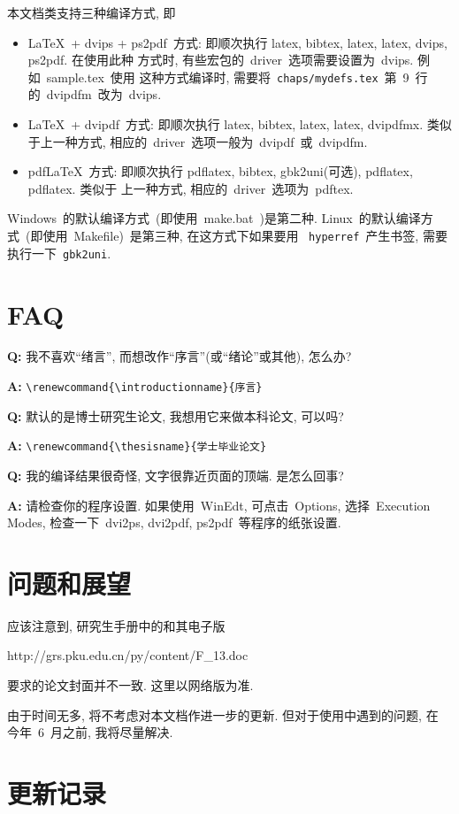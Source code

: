 本文档类支持三种编译方式, 即
\begin{itemize}
  \item \LaTeX\ + dvips + ps2pdf~方式:
    即顺次执行 latex, bibtex, latex, latex, dvips, ps2pdf. 在使用此种
    方式时, 有些宏包的~driver~选项需要设置为~dvips. 例如~sample.tex~使用
    这种方式编译时, 需要将~\verb|chaps/mydefs.tex|~第~9~行的~dvipdfm~改为~dvips.

  \item \LaTeX\ + dvipdf~方式:
    即顺次执行 latex, bibtex, latex, latex, dvipdfmx. 类似于上一种方式,
    相应的~driver~选项一般为~dvipdf~或~dvipdfm.

  \item pdf\LaTeX~方式:
    即顺次执行 pdflatex, bibtex, gbk2uni(可选), pdflatex, pdflatex. 类似于
    上一种方式, 相应的~driver~选项为~pdftex.
\end{itemize}
Windows~的默认编译方式~(即使用~make.bat~)是第二种.
Linux~的默认编译方式~(即使用~Makefile)~是第三种, 在这方式下如果要用
~\verb|hyperref|~产生书签, 需要执行一下~\verb|gbk2uni|.
\section{FAQ}

{\bf Q:} 我不喜欢``绪言'', 而想改作``序言''(或``绪论''或其他), 怎么办?

{\bf A:} \verb|\renewcommand{\introductionname}{序言}|

{\bf Q:} 默认的是博士研究生论文, 我想用它来做本科论文, 可以吗?

{\bf A:} \verb|\renewcommand{\thesisname}{学士毕业论文}|

{\bf Q:} 我的编译结果很奇怪, 文字很靠近页面的顶端. 是怎么回事?

{\bf A:} 请检查你的程序设置. 如果使用~WinEdt, 可点击~Options,
选择~Execution Modes, 检查一下~dvi2ps, dvi2pdf, ps2pdf~等程序的纸张设置.


\section{问题和展望}

应该注意到, 研究生手册中的\cite{F13}和其电子版
\begin{center}
http://grs.pku.edu.cn/py/content/F\_13.doc
\end{center}
要求的论文封面并不一致. 这里以网络版为准.

由于时间无多, 将不考虑对本文档作进一步的更新. 但对于使用中遇到的问题, 在
今年~6~月之前, 我将尽量解决.

\section{更新记录}


